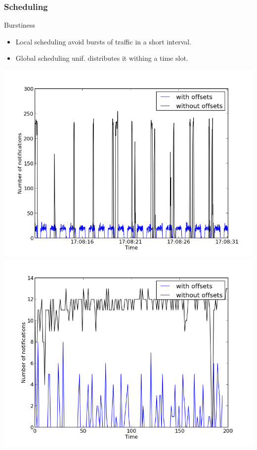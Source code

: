 \documentclass[]{prezentare}
\begin{document}
\begin{frame}
	\frametitle{Scheduling}
	\begin{block}{Burstiness}
	\begin{itemize}
	\item Local scheduling avoid bursts of traffic in a short interval. 
	\item<2> Global scheduling unif. distributes it withing a time slot.
	\end{itemize}
	\vspace{-5mm}
	\begin{center}
		{\includegraphics[scale=.375]{../Images/burstiness}}
		{\includegraphics[scale=.375]{../Images/burstiness_hires}}
	\end{center}
	\end{block}
\end{frame}
\end{document}

